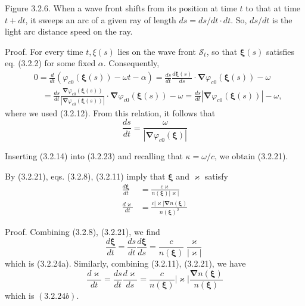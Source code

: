 \documentclass{article}
\begin{document}
Figure 3.2.6. When a wave front shifts from its position at time $t$ to that at time $t+d t$, it sweeps an arc of a given ray of length $d s=d s / d t \cdot d t$. So, $d s / d t$ is the light arc distance speed on the ray.

Proof. For every time $t, \xi(s)$ lies on the wave front $\mathcal{S}_{t}$, so that $\boldsymbol{\xi}(s)$ satisfies eq. (3.2.2) for some fixed $\alpha$. Consequently,
$$
\begin{align*}
& 0=\frac{d}{d t}\left(\varphi_{c 0}(\boldsymbol{\xi}(s))-\omega t-\alpha\right)=\frac{d s}{d t} \frac{d \boldsymbol{\xi}(s)}{d s} \cdot \boldsymbol{\nabla} \varphi_{c 0}(\boldsymbol{\xi}(s))-\omega  \tag{3.2.22}\\
& \quad=\frac{d s}{d t} \frac{\boldsymbol{\nabla} \varphi_{c 0}(\boldsymbol{\xi}(s))}{\left|\boldsymbol{\nabla} \varphi_{c 0}(\boldsymbol{\xi}(s))\right|} \cdot \boldsymbol{\nabla} \varphi_{c 0}(\boldsymbol{\xi}(s))-\omega=\frac{d s}{d t}\left|\boldsymbol{\nabla} \varphi_{c 0}(\boldsymbol{\xi}(s))\right|-\omega,
\end{align*}
$$
where we used (3.2.12). From this relation, it follows that
$$
\begin{equation*}
\frac{d s}{d t}=\frac{\omega}{\left|\boldsymbol{\nabla} \varphi_{c 0}(\boldsymbol{\xi})\right|} \tag{3.2.23}
\end{equation*}
$$

Inserting (3.2.14) into (3.2.23) and recalling that $\kappa=\omega / c$, we obtain (3.2.21).

By (3.2.21), eqs. (3.2.8), (3.2.11) imply that $\boldsymbol{\xi}$ and $\boldsymbol{\varkappa}$ satisfy
$$
\begin{align*}
\frac{d \boldsymbol{\xi}}{d t} & =\frac{c \boldsymbol{\varkappa}}{n(\boldsymbol{\xi})|\boldsymbol{\varkappa}|}  \tag{3.2.24a}\\
\frac{d \boldsymbol{\varkappa}}{d t} & =\frac{c|\boldsymbol{\varkappa}| \boldsymbol{\nabla} n(\boldsymbol{\xi})}{n(\boldsymbol{\xi})^{2}} \tag{3.2.24b}
\end{align*}
$$

Proof. Combining (3.2.8), (3.2.21), we find
$$
\begin{equation*}
\frac{d \boldsymbol{\xi}}{d t}=\frac{d s}{d t} \frac{d \boldsymbol{\xi}}{d s}=\frac{c}{n(\boldsymbol{\xi})} \frac{\varkappa}{|\varkappa|} \tag{3.2.25}
\end{equation*}
$$
which is (3.2.24a). Similarly, combining (3.2.11), (3.2.21), we have
$$
\begin{equation*}
\frac{d \varkappa}{d t}=\frac{d s}{d t} \frac{d \varkappa}{d s}=\frac{c}{n(\boldsymbol{\xi})}|\varkappa| \frac{\boldsymbol{\nabla} n(\boldsymbol{\xi})}{n(\boldsymbol{\xi})} \tag{3.2.26}
\end{equation*}
$$
which is $(3.2 .24 b)$.
\end{document}
